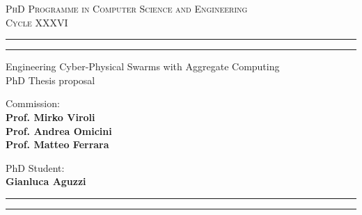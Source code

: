 \documentclass[11pt]{article}
\begin{document}
\sloppy
\begin{center}
	{{
		\Large{
			\textsc{PhD Programme in Computer Science and Engineering \\ 
			\vspace{4mm}
			Cycle XXXVI}
			}
	}} 
	\rule[0.1cm]{\textwidth}{0.1mm}
	\rule[0.4cm]{\textwidth}{0.6mm}
\end{center}

\begin{center}
	{\LARGE{Engineering Cyber-Physical Swarms with Aggregate Computing}} \\
	\vspace{4mm}
	{\large{PhD Thesis proposal}} 
	\vspace{4mm}
\end{center}
\vspace{8mm}
\par
\noindent
\begin{minipage}[t]{0.47\textwidth}

{\large{Commission: \\\bf
Prof. Mirko Viroli \\
Prof. Andrea Omicini \\
Prof. Matteo Ferrara} 
}
\end{minipage}
\hfill
\begin{minipage}[t]{0.47\textwidth}
	\raggedleft
	{
		\large{PhD Student: \\\bf Gianluca Aguzzi}
	}
\end{minipage}
\vspace{10mm}

{
	\raggedright
	\rule[0.1cm]{\textwidth}{0.6mm}
	\rule[0.5cm]{\textwidth}{0.1mm}
}
\end{document}
